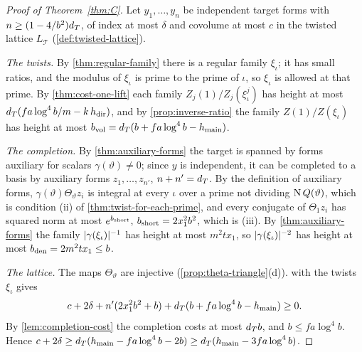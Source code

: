 \begin{proof}[Proof of Theorem~\textup{\ref{thm:C}}]
Let $y_1,\dots,y_n$ be independent target forms with $n\ge(1-4/b^2)d_T$, of index at most $\delta$ and covolume at most $c$ in the twisted lattice $L_{\mathcal T}$ (\cref{def:twisted-lattice}).

\emph{The twists.} By \cref{thm:regular-family} there is a regular family $\xi_\iota$; it has small ratios, and the modulus of $\xi_\iota$ is prime to the prime of $\iota$, so $\xi_\iota$ is allowed at that prime. By \cref{thm:cost-one-lift} each family
$Z_j(1)/Z_j(\xi^j_\iota)$ has height at most $d_T(fa\log^4b/m-k\,h_{\mathrm{dir}})$, and by \cref{prop:inverse-ratio} the family $Z(1)/Z(\xi_\iota)$ has height at most $b_{\rm vol}=d_T(b+fa\log^4b-h_{\mathrm{main}})$.

\emph{The completion.} By \cref{thm:auxiliary-forms} the target is spanned by forms auxiliary for scalars $\gamma(\vartheta)\ne0$; since $y$ is independent, it can be completed to a basis by auxiliary forms $z_1,\dots,z_{n'}$, $n+n'=d_T$. By the definition of
auxiliary forms, $\gamma(\vartheta)\Theta_\vartheta z_i$ is integral at every $\iota$ over a prime not dividing $\operatorname{N} Q(\vartheta)$, which is condition (ii) of \cref{thm:twist-for-each-prime}, and every conjugate of $\Theta_1z_i$ has squared norm at most
$e^{b_{\rm short}}$, $b_{\rm short}=2x_1^2b^2$, which is (iii). By \cref{thm:auxiliary-forms} the family $\lvert \gamma(\xi_\iota)\rvert^{-1}$ has height at most $m^2tx_1$, so $\lvert \gamma(\xi_\iota)\rvert^{-2}$ has height at most $b_{\rm den}=2m^2tx_1\le b$.

\emph{The lattice.} The maps $\Theta_\vartheta$ are injective (\cref{prop:theta-triangle}(d)).  with the twists $\xi_\iota$ gives
\[
  c+2\delta+n'(2x_1^2b^2+b)+d_T(b+fa\log^4b-h_{\mathrm{main}})\ge0.
\]
By \cref{lem:completion-cost} the completion costs at most $d_T b$, and $b\le fa\log^4b$. Hence $c+2\delta\ge d_T(h_{\mathrm{main}}-fa\log^4b-2b)\ge d_T(h_{\mathrm{main}}-3fa\log^4b)$.
\end{proof}
